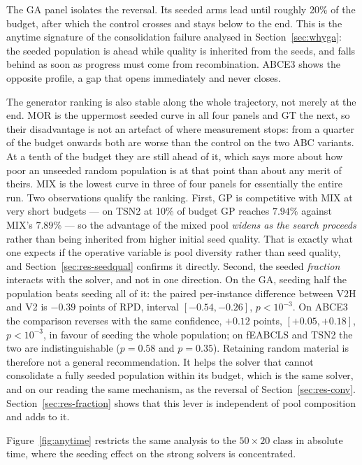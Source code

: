 \documentclass[review]{elsarticle}
\begin{document}
The GA panel isolates the reversal. Its seeded arms lead until roughly
20\% of the budget, after which the control crosses and stays below to the
end. This is the anytime signature of the consolidation failure analysed in
Section~\ref{sec:whyga}: the seeded population is ahead while quality is
inherited from the seeds, and falls behind as soon as progress must come
from recombination. ABCE3 shows the opposite profile, a gap that opens
immediately and never closes.

The generator ranking is also stable along the whole trajectory, not merely
at the end. MOR is the uppermost seeded curve in all four panels and GT the
next, so their disadvantage is not an artefact of where measurement stops:
from a quarter of the budget onwards both are worse than the control on the
two ABC variants. At a tenth of the budget they are still ahead of it,
which says more about how poor an unseeded random population is at that
point than about any merit of theirs. MIX is the lowest curve in three of
four panels for essentially the entire run. Two observations qualify the
ranking. First, GP is competitive with MIX at very short budgets --- on
TSN2 at 10\% of budget GP reaches $7.94\%$ against MIX's $7.89\%$ --- so
the advantage of the mixed pool \emph{widens as the search proceeds} rather
than being inherited from higher initial seed quality. That is exactly what
one expects if the operative variable is pool diversity rather than seed
quality, and Section~\ref{sec:res-seedqual} confirms it directly. Second,
the seeded \emph{fraction} interacts with the solver, and not in one
direction. On the GA, seeding half the population beats seeding all of it:
the paired per-instance difference between V2H and V2 is $-0.39$ points of
RPD, interval $[-0.54,-0.26]$, $p<10^{-3}$. On ABCE3 the comparison
reverses with the same confidence, $+0.12$ points, $[+0.05,+0.18]$,
$p<10^{-3}$, in favour of seeding the whole population; on fEABCLS and TSN2
the two are indistinguishable ($p=0.58$ and $p=0.35$). Retaining random
material is therefore not a general recommendation. It helps the solver
that cannot consolidate a fully seeded population within its budget, which
is the same solver, and on our reading the same mechanism, as the reversal
of Section~\ref{sec:res-conv}. Section~\ref{sec:res-fraction} shows that
this lever is independent of pool composition and adds to it.

Figure~\ref{fig:anytime} restricts the same analysis to the $50\times20$
class in absolute time, where the seeding effect on the strong solvers is
concentrated.
\end{document}
